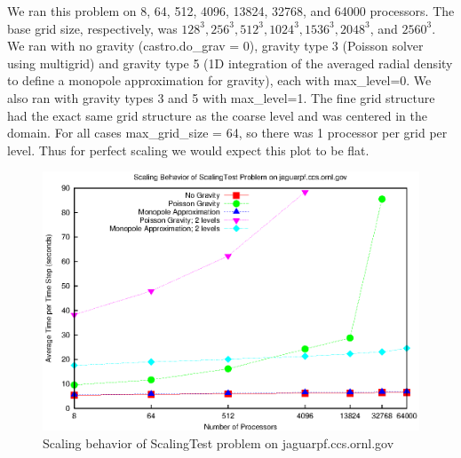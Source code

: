 We ran this problem on 8, 64, 512, 4096, 13824, 32768, and 64000 processors.  The base grid size, respectively, was $128^3, 256^3, 512^3, 1024^3, 1536^3, 2048^3$, and $2560^3$.  We ran with no gravity (castro.do\_grav = 0), gravity type 3 (Poisson solver using multigrid) and gravity type 5 (1D integration of the averaged radial density to define a monopole approximation for gravity), each with max\_level=0.  We also ran with gravity types 3 and 5 with max\_level=1.  The fine grid structure had the exact same grid structure as the coarse level and was centered in the domain.  For all cases max\_grid\_size = 64, so there was 1 processor per grid per level.  Thus for perfect scaling we would expect this plot to be flat. 
\begin{figure}[h]
\centering
\includegraphics[width=5in]{scaling_jaguarpf}
\caption{Scaling behavior of ScalingTest problem on jaguarpf.ccs.ornl.gov}
\end{figure}
